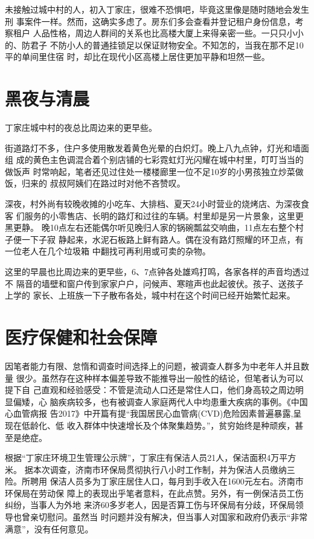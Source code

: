   未接触过城中村的人，初入丁家庄，很难不恐惧吧，毕竟这里像是随时随地会发生刑
  事案件一样。然而，这确实多虑了。房东们多会查看并登记租户身份信息，考察租户
  人品性格，周边人群间的关系也比高楼大厦上来得亲密一些。一只只小小的、防君子
  不防小人的普通挂锁足以保证财物安全。不知怎的，当我在那不足10平的单间里住宿
  时，却比在现代小区高楼上居住更加平静和坦然一些。

  \section{黑夜与清晨}

  丁家庄城中村的夜总比周边来的更早些。

  街道路灯不多，住户多使用散发着黄色光晕的白炽灯。晚上八九点钟，灯光和墙面组
  成的黄色主色调混合着个别店铺的七彩霓虹灯光闪耀在城中村里，叮叮当当的做饭声
  时常响起，笔者还见过住处一楼楼廊里一位不足10岁的小男孩独立炒菜做饭，归来的
  叔叔阿姨们在路过时对他不吝赞叹。

  深夜，村外尚有较晚收摊的小吃车、大排档、夏天24小时营业的烧烤店、为深夜食客
  们服务的小零售店、长明的路灯和过往的车辆。村里却是另一片景象，这里更黑更静。
  晚10点左右还能偶尔听见晚归人家的锅碗瓢盆交响曲，11点左右整个村子便一下子寂
  静起来，水泥石板路上鲜有路人。偶在没有路灯照耀的环卫点，有一位老人在几个垃圾箱
  中翻找可再利用或可卖的杂物。

  这里的早晨也比周边来的更早些，6、7点钟各处雄鸡打鸣，各家各样的声音均透过不
  隔音的墙壁和窗户传到家家户户，问候声、寒暄声也此起彼伏。孩子、送孩子上学的
  家长、上班族一下子散布各处，城中村在这个时间已经开始繁忙起来。

  \section{医疗保健和社会保障}

  因笔者能力有限、怠惰和调查时间选择上的问题，被调查人群多为中老年人并且数量
  很少。虽然存在这种样本偏差导致不能推导出一般性的结论，但笔者认为可以提下自
  己直观和经验感受：不管是流动人口还是常住人口，他们身高较之周边明显偏矮，心
  脑疾病较多，也有被调查人家庭两代人中均患重大疾病的事例。《中国心血管病报
  告2017》中开篇有提“我国居民心血管病(CVD)危险因素普遍暴露,呈现在低龄化、低
  收入群体中快速增长及个体聚集趋势。”，贫穷始终是种顽疾，甚至是绝症。

  根据“丁家庄环境卫生管理公示牌”，丁家庄有保洁人员21人，保洁面积4万平方米。
  据本次调查，济南市环保局贯彻执行八小时工作制，并为保洁人员缴纳三险。所聘用
  保洁人员多为丁家庄居住人口，每月到手收入在1600元左右。济南市环保局在劳动保
  障上的表现出乎笔者意料，在此点赞。另外，有一例保洁员工伤纠纷，当事人为外地
  来济60多岁老人，因是否算工伤与环保局有分歧，环保局领导也曾亲切慰问。虽然当
  时问题并没有解决，但当事人对国家和政府仍表示“非常满意”，没有任何意见。

